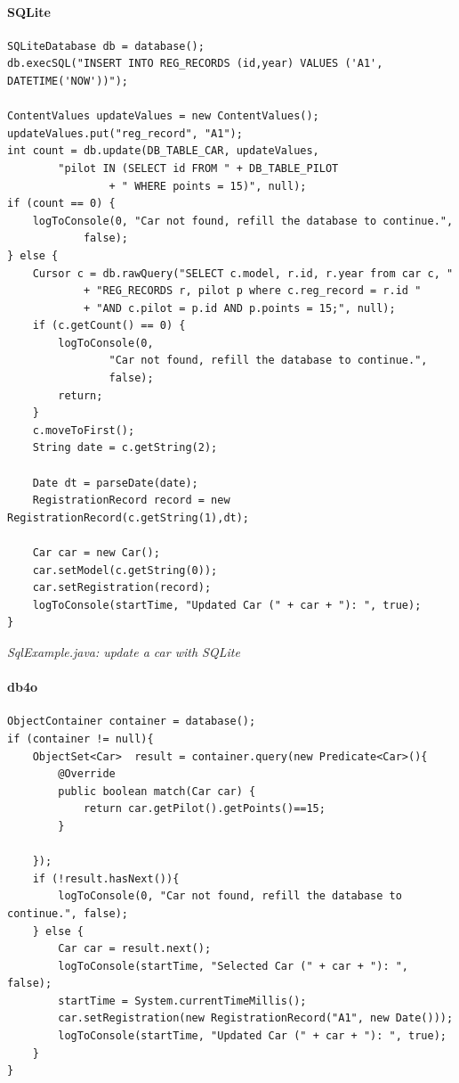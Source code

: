 \paragraph*{SQLite}

\begin{lstlisting}
SQLiteDatabase db = database();
db.execSQL("INSERT INTO REG_RECORDS (id,year) VALUES ('A1', DATETIME('NOW'))");

ContentValues updateValues = new ContentValues();
updateValues.put("reg_record", "A1");
int count = db.update(DB_TABLE_CAR, updateValues,
        "pilot IN (SELECT id FROM " + DB_TABLE_PILOT
                + " WHERE points = 15)", null);
if (count == 0) {
    logToConsole(0, "Car not found, refill the database to continue.",
            false);
} else {
    Cursor c = db.rawQuery("SELECT c.model, r.id, r.year from car c, "
            + "REG_RECORDS r, pilot p where c.reg_record = r.id "
            + "AND c.pilot = p.id AND p.points = 15;", null);
    if (c.getCount() == 0) {
        logToConsole(0,
                "Car not found, refill the database to continue.",
                false);
        return;
    }
    c.moveToFirst();
    String date = c.getString(2);
    
    Date dt = parseDate(date);
    RegistrationRecord record = new RegistrationRecord(c.getString(1),dt);
    
    Car car = new Car();
    car.setModel(c.getString(0));
    car.setRegistration(record);
    logToConsole(startTime, "Updated Car (" + car + "): ", true);
}
\end{lstlisting}

{\small\itshape SqlExample.java: update a car with SQLite\par}
\medskip

\paragraph*{db4o}

\begin{lstlisting}
ObjectContainer container = database();
if (container != null){
    ObjectSet<Car>  result = container.query(new Predicate<Car>(){
        @Override
        public boolean match(Car car) {
            return car.getPilot().getPoints()==15;
        }
        
    });
    if (!result.hasNext()){
        logToConsole(0, "Car not found, refill the database to continue.", false);
    } else {
        Car car = result.next();
        logToConsole(startTime, "Selected Car (" + car + "): ", false);
        startTime = System.currentTimeMillis();
        car.setRegistration(new RegistrationRecord("A1", new Date()));
        logToConsole(startTime, "Updated Car (" + car + "): ", true);
    }            
}
\end{lstlisting}

